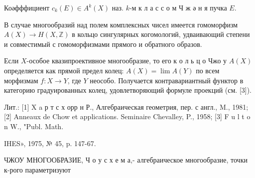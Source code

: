 \documentclass[10pt]{article}
\begin{document}
Коәфффициент $c_{k}(E) \in A^{k}(X)$ наз. $k$-м к л а с с о м Ч ж ә н я пучка $E$.



В случае многообразий над полем комплексных чисел имеется гомоморфизм $A(X) \rightarrow H(X, \mathbb{Z})$ в кольцо сингулярных когомологий, удваивающий степени и совместимый с гомоморфизмами прямого и обратного образов.



Если $X$-особое квазипроективное многообразие, то его к о л ь ц о Чжо у $A(X)$ определяется как прямой предел колец: $A(X)=\lim A(Y)$ по всем морфизмам $f: X \longrightarrow Y$, где $Y$ неособо. Получается контравариантный функтор в категорию градуированных колец, удовлетворяющий формуле проекций (см. [3]).



Лит.: [1] X a р т с х орр н Р., Алгебраическая геометрия, пер. с англ., M., 1981; [2] Anneaux de Chow et applications. Seminaire Chevalley, P., 1958; [3] F u l t o n W., "Publ. Math.

IHES», 1975, № 45, p. 147-67.



ЧЖОУ МНОГООБРАЗИЕ, Ч о у с х е м а,- алгебраическое многообразие, точки к-рого параметризуют
\end{document}
